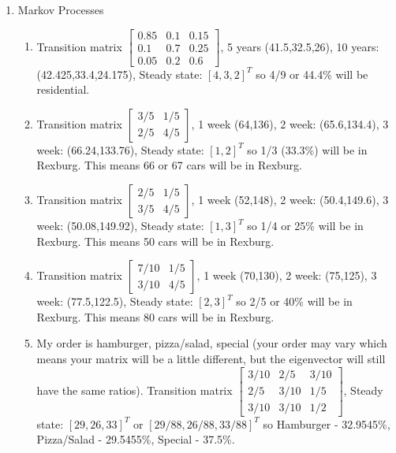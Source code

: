 {\begin{multicols}{2}
\begin{enumerate}
\begin{enumerate}
\end{enumerate}






\item Markov Processes

\begin{enumerate}
\item Transition matrix 
$\begin{bmatrix}
 0.85 & 0.1 & 0.15 \\
 0.1 & 0.7 & 0.25 \\
 0.05 & 0.2 & 0.6
\end{bmatrix}$,
5 years  (41.5,32.5,26), 
10 years: (42.425,33.4,24.175),
Steady state: $[4,3,2]^T$ so 4/9 or 44.4\% will be residential. 

\item
Transition matrix 
$\begin{bmatrix}
 {3}/{5} & {1}/{5} \\
 {2}/{5} & {4}/{5}
\end{bmatrix}$,
1 week  (64,136), 
2 week: (65.6,134.4),
3 week: (66.24,133.76),
Steady state: $[1,2]^T$ so 1/3 (33.3\%) will be in Rexburg. This means 66 or 67 cars will be in Rexburg. 
 
\item 
Transition matrix 
$\begin{bmatrix}
 {2}/{5} & {1}/{5} \\
 {3}/{5} & {4}/{5}
\end{bmatrix}$,
1 week  (52,148), 
2 week: (50.4,149.6),
3 week: (50.08,149.92),
Steady state: $[1,3]^T$ so 1/4 or 25\% will be in Rexburg. This means 50 cars will be in Rexburg. 

\item 
Transition matrix 
$\begin{bmatrix}
 {7}/{10} & {1}/{5} \\
 {3}/{10} & {4}/{5}
\end{bmatrix}$,
1 week  (70,130), 
2 week: (75,125),
3 week: (77.5,122.5),
Steady state: $[2,3]^T$ so 2/5 or 40\% will be in Rexburg. This means 80 cars will be in Rexburg. 

\item My order is hamburger, pizza/salad, special (your order may vary which means your matrix will be a little different, but the eigenvector will still have the same ratios).
Transition matrix 
$\begin{bmatrix}
 {3}/{10} & {2}/{5} & {3}/{10} \\
 {2}/{5} & {3}/{10} & {1}/{5} \\
 {3}/{10} & {3}/{10} & {1}/{2}
\end{bmatrix}$,
Steady state: $[29,26,33]^T$ or $[29/88,26/88,33/88]^T$ so Hamburger - 32.9545\%, Pizza/Salad - 29.5455\%, Special - 37.5\%. 


\end{enumerate}
\end{enumerate}
\end{multicols}}
